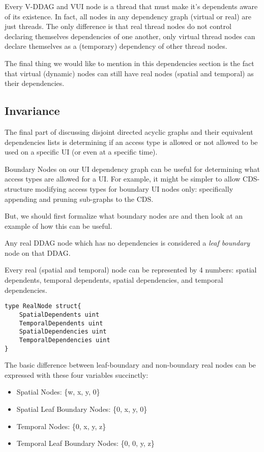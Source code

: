 Every V-DDAG and VUI node is a thread that must make it's dependents aware of its existence. In fact, all nodes in any dependency graph (virtual or real) are just threads. The only difference is that real thread nodes do not control declaring themselves dependencies of one another, only virtual thread nodes can declare themselves as a (temporary) dependency of other thread nodes.

The final thing we would like to mention in this dependencies section is the fact that virtual (dynamic) nodes can still have real nodes (spatial and temporal) as their dependencies.

\subsection{Invariance}

The final part of discussing disjoint directed acyclic graphs and their equivalent dependencies lists is determining if an access type is allowed or not allowed to be used on a specific UI (or even at a specific time).

Boundary Nodes on our UI dependency graph can be useful for determining what access types are allowed for a UI. For example, it might be simpler to allow CDS-structure modifying access types for boundary UI nodes only: specifically appending and pruning sub-graphs to the CDS. 

But, we should first formalize what boundary nodes are and then look at an example of how this can be useful.

\begin{con-def}
	\label{leaf-boundaries}
	Any real DDAG node which has no dependencies is considered a \textit{leaf boundary} node on that DDAG.
\end{con-def}

Every real (spatial and temporal) node can be represented by 4 numbers: spatial dependents, temporal dependents, spatial dependencies, and temporal dependencies.

\begin{verbatim}
type RealNode struct{
	SpatialDependents uint
	TemporalDependents uint
	SpatialDependencies uint
	TemporalDependencies uint
}
\end{verbatim}

The basic difference between leaf-boundary and non-boundary real nodes can be expressed with these four variables succinctly:

\begin{itemize}
	\item Spatial Nodes: \{w, x, y, 0\}
	\item Spatial Leaf Boundary Nodes: \{0, x, y, 0\}
	\item Temporal Nodes: \{0, x, y, z\}
	\item Temporal Leaf Boundary Nodes: \{0, 0, y, z\}
\end{itemize}

